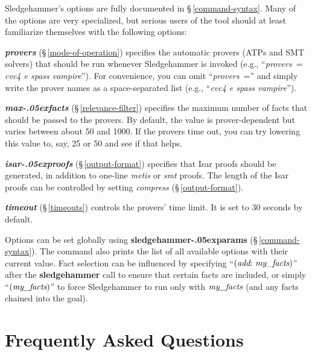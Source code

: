 \documentclass[a4paper,12pt]{article}
\let\oldS=\S
\def\S{\oldS\,}
\renewcommand\_{\hbox{\textunderscore\kern-.05ex}}
\begin{document}

Sledgehammer's options are fully documented in \S\ref{command-syntax}. Many of
the options are very specialized, but serious users of the tool should at least
familiarize themselves with the following options:

\begin{enum}
\item[\labelitemi] \textbf{\textit{provers}} (\S\ref{mode-of-operation}) specifies
the automatic provers (ATPs and SMT solvers) that should be run whenever
Sledgehammer is invoked (e.g., ``\textit{provers}~= \textit{cvc4 e spass
vampire\/}''). For convenience, you can omit ``\textit{provers}~=''
and simply write the prover names as a space-separated list (e.g., ``\textit{cvc4 e
spass vampire\/}'').

\item[\labelitemi] \textbf{\textit{max\_facts}} (\S\ref{relevance-filter})
specifies the maximum number of facts that should be passed to the provers. By
default, the value is prover-dependent but varies between about 50 and 1000. If
the provers time out, you can try lowering this value to, say, 25 or 50 and see
if that helps.

\item[\labelitemi] \textbf{\textit{isar\_proofs}} (\S\ref{output-format}) specifies
that Isar proofs should be generated, in addition to one-line \textit{metis} or
\textit{smt} proofs. The length of the Isar proofs can be controlled by setting
\textit{compress} (\S\ref{output-format}).

\item[\labelitemi] \textbf{\textit{timeout}} (\S\ref{timeouts}) controls the
provers' time limit. It is set to 30 seconds by default.
\end{enum}

Options can be set globally using \textbf{sledgehammer\_params}
(\S\ref{command-syntax}). The command also prints the list of all available
options with their current value. Fact selection can be influenced by specifying
``$(\textit{add}{:}~\textit{my\_facts})$'' after the \textbf{sledgehammer} call
to ensure that certain facts are included, or simply ``$(\textit{my\_facts})$''
to force Sledgehammer to run only with $\textit{my\_facts}$ (and any facts
chained into the goal).


\section{Frequently Asked Questions}
\label{frequently-asked-questions}
\end{document}
